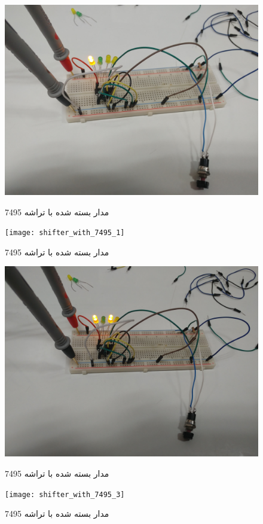 \documentclass[twoside]{article}
\begin{document}
	\begin{figure}[h!]
		\begin{center}
			\includegraphics[scale=0.05]{shifter_with_7495_0}‎
			\caption{مدار بسته شده با تراشه 7495}
		\end{center}
	\end{figure} 
	\begin{figure}[h!]
		\begin{center}
			\texttt{[image: shifter\_with\_7495\_1]}‎
			\caption{مدار بسته شده با تراشه 7495}
		\end{center}
	\end{figure} 
	\begin{figure}[h!]
		\begin{center}
			\includegraphics[scale=0.05]{shifter_with_7495_2}‎
			\caption{مدار بسته شده با تراشه 7495}
		\end{center}
	\end{figure} 
	\begin{figure}[h!]
		\begin{center}
			\texttt{[image: shifter\_with\_7495\_3]}‎
			\caption{مدار بسته شده با تراشه 7495}
		\end{center}
	\end{figure} 
	
\end{document}
